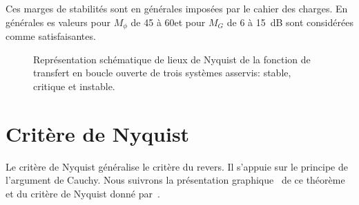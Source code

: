Ces marges de stabilités sont en générales imposées par le cahier des charges.
En générales es valeurs pour $M_{\phi}$ de 45 à 60\degreeSI et
pour $M_G$ de 6 à 15~\si{\dB} sont considérées comme satisfaisantes.
\begin{figure}[!h]
    \centering
    
    \caption{Représentation schématique de lieux de Nyquist de la fonction 
             de transfert en boucle ouverte de trois systèmes asservis: 
             stable, critique et instable. \label{fig-nyquist_revers}}
\end{figure}
\clearpage
\section{Critère de Nyquist}
Le critère de Nyquist généralise le critère du revers.
Il s'appuie sur le principe de l'argument de Cauchy.
Nous suivrons la présentation \og graphique\fg~ de ce théorème 
et du critère de Nyquist donné par~\cite{reg,katkim}. 
